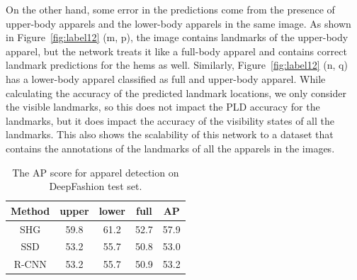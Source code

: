 \documentclass[conference]{IEEEtran}
\begin{document}
On the other hand, some error in the predictions come from the presence of upper-body apparels and the lower-body apparels in the same image. As shown in Figure~\ref{fig:label12} (m, p), the image contains landmarks of the upper-body apparel, but the network treats it like a full-body apparel and contains correct landmark predictions for the hems as well. Similarly, Figure~\ref{fig:label12} (n, q) has a lower-body apparel classified as full and upper-body apparel. While calculating the accuracy of the predicted landmark locations, we only consider the visible landmarks, so this does not impact the PLD accuracy for the landmarks, but it does impact the accuracy of the visibility states of all the landmarks. This also shows the scalability of this network to a dataset that contains the annotations of the landmarks of all the apparels in the images.
\begin{table}[ht]
    \centering
     \scriptsize
    \caption{The AP score for apparel detection on DeepFashion test set.}
    \begin{tabular}{|c|c|c|c|c|}
    \hline
    \textbf{Method} & \textbf{upper} & \textbf{lower} & \textbf{full}  & \textbf{AP} \\[3pt]
    \hline
    SHG   & 59.8 & 61.2  & 52.7 & 57.9 \\[2pt]
    \hline
    SSD  & 53.2 & 55.7  & 50.8 & 53.0  \\[2pt]
    \hline
    R-CNN  & 53.2 & 55.7  & 50.9 & 53.2 \\[2pt]
    \hline
    \end{tabular}
    \label{table:table15}
\end{table}
\end{document}
